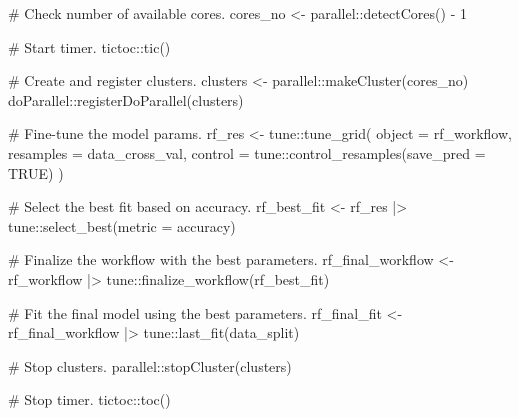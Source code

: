 \documentclass[
  letterpaper,
  DIV=11,
  numbers=noendperiod]{scrartcl}
\newenvironment{Shaded}{\begin{snugshade}}{\end{snugshade}}
\newcommand{\AttributeTok}[1]{\textcolor[rgb]{0.40,0.45,0.13}{#1}}
\newcommand{\CommentTok}[1]{\textcolor[rgb]{0.37,0.37,0.37}{#1}}
\newcommand{\ConstantTok}[1]{\textcolor[rgb]{0.56,0.35,0.01}{#1}}
\newcommand{\DecValTok}[1]{\textcolor[rgb]{0.68,0.00,0.00}{#1}}
\newcommand{\FunctionTok}[1]{\textcolor[rgb]{0.28,0.35,0.67}{#1}}
\newcommand{\NormalTok}[1]{\textcolor[rgb]{0.00,0.23,0.31}{#1}}
\newcommand{\OtherTok}[1]{\textcolor[rgb]{0.00,0.23,0.31}{#1}}
\newcommand{\SpecialCharTok}[1]{\textcolor[rgb]{0.37,0.37,0.37}{#1}}
\newcommand{\StringTok}[1]{\textcolor[rgb]{0.13,0.47,0.30}{#1}}
\begin{document}
\begin{Shaded}
\begin{Highlighting}[]
\CommentTok{\#\textquotesingle{} Check number of available cores.}
\NormalTok{cores\_no }\OtherTok{\textless{}{-}}\NormalTok{ parallel}\SpecialCharTok{::}\FunctionTok{detectCores}\NormalTok{() }\SpecialCharTok{{-}} \DecValTok{1}

\CommentTok{\#\textquotesingle{} Start timer.}
\NormalTok{tictoc}\SpecialCharTok{::}\FunctionTok{tic}\NormalTok{()}

\CommentTok{\# Create and register clusters.}
\NormalTok{clusters }\OtherTok{\textless{}{-}}\NormalTok{ parallel}\SpecialCharTok{::}\FunctionTok{makeCluster}\NormalTok{(cores\_no)}
\NormalTok{doParallel}\SpecialCharTok{::}\FunctionTok{registerDoParallel}\NormalTok{(clusters)}

\CommentTok{\# Fine{-}tune the model params.}
\NormalTok{rf\_res }\OtherTok{\textless{}{-}}\NormalTok{ tune}\SpecialCharTok{::}\FunctionTok{tune\_grid}\NormalTok{(}
  \AttributeTok{object =}\NormalTok{ rf\_workflow,}
  \AttributeTok{resamples =}\NormalTok{ data\_cross\_val,}
  \AttributeTok{control =}\NormalTok{ tune}\SpecialCharTok{::}\FunctionTok{control\_resamples}\NormalTok{(}\AttributeTok{save\_pred =} \ConstantTok{TRUE}\NormalTok{)}
\NormalTok{)}

\CommentTok{\# Select the best fit based on accuracy.}
\NormalTok{rf\_best\_fit }\OtherTok{\textless{}{-}} 
\NormalTok{  rf\_res }\SpecialCharTok{|\textgreater{}} 
\NormalTok{  tune}\SpecialCharTok{::}\FunctionTok{select\_best}\NormalTok{(}\AttributeTok{metric =} \StringTok{\textquotesingle{}accuracy\textquotesingle{}}\NormalTok{)}

\CommentTok{\# Finalize the workflow with the best parameters.}
\NormalTok{rf\_final\_workflow }\OtherTok{\textless{}{-}} 
\NormalTok{  rf\_workflow }\SpecialCharTok{|\textgreater{}}
\NormalTok{  tune}\SpecialCharTok{::}\FunctionTok{finalize\_workflow}\NormalTok{(rf\_best\_fit)}

\CommentTok{\# Fit the final model using the best parameters.}
\NormalTok{rf\_final\_fit }\OtherTok{\textless{}{-}} 
\NormalTok{  rf\_final\_workflow }\SpecialCharTok{|\textgreater{}} 
\NormalTok{  tune}\SpecialCharTok{::}\FunctionTok{last\_fit}\NormalTok{(data\_split)}

\CommentTok{\# Stop clusters.}
\NormalTok{parallel}\SpecialCharTok{::}\FunctionTok{stopCluster}\NormalTok{(clusters)}

\CommentTok{\# Stop timer.}
\NormalTok{tictoc}\SpecialCharTok{::}\FunctionTok{toc}\NormalTok{()}
\end{Highlighting}
\end{Shaded}
\end{document}

